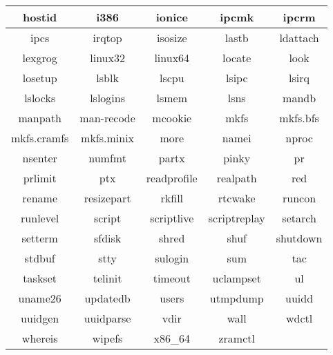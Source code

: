 \begin{center}
    \begin{tabular}{|c|c|c|c|c|}
        \hline
        hostid & i386 & ionice & ipcmk & ipcrm \\
        \hline
        ipcs & irqtop & isosize & lastb & ldattach \\
        \hline
        lexgrog & linux32 & linux64 & locate & look \\
        \hline
        losetup & lsblk & lscpu & lsipc & lsirq \\
        \hline
        lslocks & lslogins & lsmem & lsns & mandb \\
        \hline
        manpath & man-recode & mcookie & mkfs & mkfs.bfs \\
        \hline
        mkfs.cramfs & mkfs.minix & more & namei & nproc \\
        \hline
        nsenter & numfmt & partx & pinky & pr \\
        \hline
        prlimit & ptx & readprofile & realpath & red \\
        \hline
        rename & resizepart & rkfill & rtcwake & runcon \\
        \hline
        runlevel & script & scriptlive & scriptreplay & setarch \\
        \hline
        setterm & sfdisk & shred & shuf & shutdown \\
        \hline
        stdbuf & stty & sulogin & sum & tac \\
        \hline
        taskset & telinit & timeout & uclampset & ul \\
        \hline
        uname26 & updatedb & users & utmpdump & uuidd \\
        \hline
        uuidgen & uuidparse & vdir & wall & wdctl \\
        \hline
        whereis & wipefs & x86\_64 & zramctl \\
        \cline{1-4}
    \end{tabular}
\end{center}
